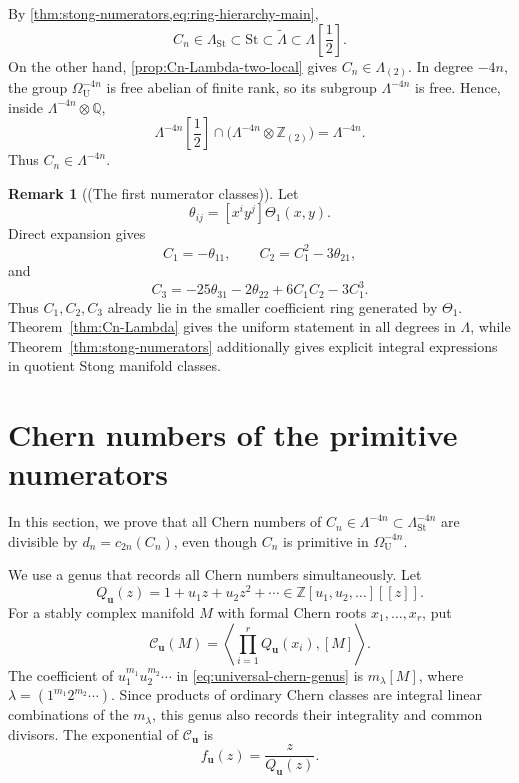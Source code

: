 \documentclass[14pt,dvipsnames]{extarticle}
\makeatletter
\numberwithin{equation}{subsection}
\theoremstyle{plain}
\theoremstyle{definition}
\theoremstyle{definition}
\newtheorem{remark}[remark]{Remark}
\renewenvironment{proof}[1][\proofname]{
 \par\pushQED{\qed}\normalfont
 \topsep6\p@\@plus6\p@\relax
 \trivlist\item[\hskip\labelsep\bfseries\itshape #1\@addpunct{.}]
}{\popQED\endtrivlist\@endpefalse}
\newcommand{\Uu}{\mathrm{U}}
\newcommand{\St}{\mathrm{St}}
\newcommand{\LambdaSt}{\Lambda_{\mathrm{St}}}
\newcommand{\Q}{\mathbb{Q}}
\newcommand{\Ztwo}{\mathbb{Z}_{(2)}}
\makeatother
\begin{document}
\begin{proof}[Proof of \cref{thm:Cn-Lambda}]
By \cref{thm:stong-numerators,eq:ring-hierarchy-main},
\[
 C_n\in\LambdaSt
 \subset\St
 \subset\widetilde\Lambda
 \subset\Lambda\!\left[\frac12\right].
\]
On the other hand, \cref{prop:Cn-Lambda-two-local} gives
$C_n\in\Lambda_{(2)}$. In degree $-4n$, the group
$\Omega_{\Uu}^{-4n}$ is free abelian of finite rank, so its subgroup
$\Lambda^{-4n}$ is free. Hence, inside
$\Lambda^{-4n}\otimes\Q$,
\[
 \Lambda^{-4n}\!\left[\frac12\right]
 \cap
 \bigl(\Lambda^{-4n}\otimes\Ztwo\bigr)
 =\Lambda^{-4n}.
\]
Thus $C_n\in\Lambda^{-4n}$.
\end{proof}

\begin{remark}[(The first numerator classes)]
Let
\[
 \theta_{ij}=[x^iy^j]\Theta_1(x,y).
\]
Direct expansion gives
\[
 C_1=-\theta_{11},
 \qquad
 C_2=C_1^2-3\theta_{21},
\]
and
\[
 C_3
 =-25\theta_{31}-2\theta_{22}
  +6C_1C_2-3C_1^3.
\]
Thus $C_1,C_2,C_3$ already lie in the smaller coefficient ring generated by
$\Theta_1$. Theorem~\ref{thm:Cn-Lambda} gives the uniform statement in all degrees
in $\Lambda$, while Theorem~\ref{thm:stong-numerators} additionally gives
explicit integral expressions in quotient Stong manifold classes.
\end{remark}

\section{Chern numbers of the primitive numerators}\label{sec:chern-divisibility}

In this section, we prove that all Chern numbers of
$C_n\in\Lambda^{-4n}\subset\LambdaSt^{-4n}$ are divisible by
$d_n=c_{2n}(C_n)$, even though $C_n$ is primitive in
$\Omega_{\Uu}^{-4n}$.

We use a genus that records all Chern numbers simultaneously. Let
\[
 Q_{\boldsymbol u}(z)=1+u_1z+u_2z^2+\cdots
 \in\mathbb Z[u_1,u_2,\ldots][[z]].
\]
For a stably complex manifold $M$ with formal Chern roots
$x_1,\ldots,x_r$, put
\begin{equation}\label{eq:universal-chern-genus}
 \mathcal C_{\boldsymbol u}(M)
 =\left\langle\prod_{i=1}^rQ_{\boldsymbol u}(x_i),[M]\right\rangle.
\end{equation}
The coefficient of $u_1^{m_1}u_2^{m_2}\cdots$ in
\eqref{eq:universal-chern-genus} is $m_\lambda[M]$, where
$\lambda=(1^{m_1}2^{m_2}\cdots)$. Since products of ordinary Chern classes
are integral linear combinations of the $m_\lambda$, this genus also
records their integrality and common divisors. The exponential of
$\mathcal C_{\boldsymbol u}$ is
\[
 f_{\boldsymbol u}(z)=\frac{z}{Q_{\boldsymbol u}(z)}.
\]
\end{document}
